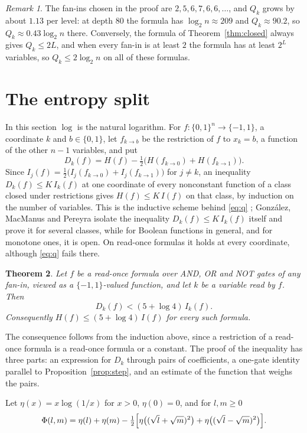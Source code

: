 \documentclass[11pt]{amsart}
\newtheorem{theorem}{Theorem}[section]
\theoremstyle{definition}\newtheorem{definition}[theorem]{Definition}
\theoremstyle{remark}\newtheorem{remark}[theorem]{Remark}
\begin{document}
\begin{remark}
The fan-ins chosen in the proof are $2,5,6,7,6,6,\dots$, and $Q_k$ grows by about $1.13$ per level: at depth $80$ the
formula has $\log_2n\approx209$ and $Q_k\approx90.2$, so $Q_k\approx0.43\log_2n$ there. Conversely, the formula of
Theorem~\ref{thm:closed} always gives $Q_k\le2L$, and when every fan-in is at least $2$ the formula has at least $2^L$
variables, so $Q_k\le2\log_2n$ on all of these formulas.
\end{remark}

\section{The entropy split}\label{sec:split}

In this section $\log$ is the natural logarithm. For $f\colon\{0,1\}^n\to\{-1,1\}$, a coordinate $k$ and
$b\in\{0,1\}$, let $f_{k\to b}$ be the restriction of $f$ to $x_k=b$, a function of the other $n-1$ variables, and put
\[
D_k(f)=H(f)-\tfrac12\bigl(H(f_{k\to0})+H(f_{k\to1})\bigr).
\]
Since $I_j(f)=\frac12\bigl(I_j(f_{k\to0})+I_j(f_{k\to1})\bigr)$ for $j\ne k$, an inequality $D_k(f)\le K\,I_k(f)$ at one
coordinate of every nonconstant function of a class closed under restrictions gives $H(f)\le K\,I(f)$ on that class,
by induction on the number of variables. This is the inductive scheme behind \eqref{eq:q} \cite{han}; Gonz\'alez,
MacManus and Pereyra \cite{gmp} isolate the inequality $D_k(f)\le K\,I_k(f)$ itself and prove it for several classes,
while for Boolean functions in general, and for monotone ones, it is open. On read-once formulas it holds at every
coordinate, although \eqref{eq:q} fails there.

\begin{theorem}\label{thm:split}
Let $f$ be a read-once formula over AND, OR and NOT gates of any fan-in, viewed as a $\{-1,1\}$-valued function, and
let $k$ be a variable read by $f$. Then
\[
D_k(f)<(5+\log4)\,I_k(f).
\]
Consequently $H(f)\le(5+\log4)\,I(f)$ for every such formula.
\end{theorem}

The consequence follows from the induction above, since a restriction of a read-once formula is a read-once formula
or a constant. The proof of the inequality has three parts: an expression for $D_k$ through pairs of coefficients, a
one-gate identity parallel to Proposition~\ref{prop:step}, and an estimate of the function that weighs the pairs.

Let $\eta(x)=x\log(1/x)$ for $x>0$, $\eta(0)=0$, and for $l,m\ge0$
\[
\Phi(l,m)=\eta(l)+\eta(m)-\tfrac12\Bigl[\eta\bigl((\sqrt l+\sqrt m)^2\bigr)+\eta\bigl((\sqrt l-\sqrt m)^2\bigr)\Bigr].
\]
\end{document}
